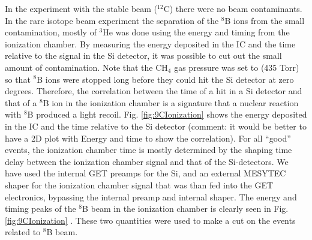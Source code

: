 \documentclass[final,number,sort&compress,5p,times,twocolumn]{elsarticle}
\begin{document}
In the experiment with the stable beam ($^{12}$C) there were no beam contaminants. In the rare isotope beam experiment the separation of the $^{8}$B ions from the small contamination, mostly of $^3$He was done using the energy and timing from the ionization chamber. By measuring the energy deposited in the IC and the time relative to the signal in the Si detector, it was possible to cut out the small amount of contamination. Note that the CH$_4$ gas pressure was set to (435 Torr) so that $^8$B ions were stopped long before they could hit the Si detector at zero degrees. Therefore, the correlation between the time of a hit in a Si detector and that of a  $^8$B ion in the ionization chamber is a signature that a nuclear reaction with $^8$B produced a light recoil. Fig. \ref{fig:9CIonization} shows the energy deposited in the IC and the time relative to the Si detector (comment: it would be better to have a 2D plot with Energy and time to show the correlation). For all ``good'' events, the ionization chamber time is mostly determined by the shaping time delay between the ionization chamber signal and that of the Si-detectors. We have used the internal GET preamps for the Si, and an external MESYTEC shaper for the ionization chamber signal that was than fed into the GET electronics, bypassing the internal preamp and internal shaper. The energy and timing peaks of the $^{8}$B beam in the ionization chamber is clearly seen in Fig. \ref{fig:9CIonization} . These two quantities were used to make a cut on the events related to $^{8}$B beam.






\end{document}
